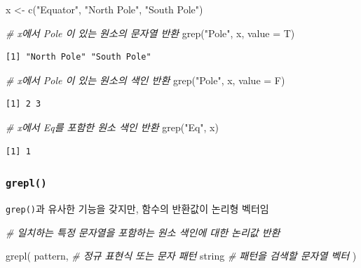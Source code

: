 \documentclass[
  11pt,
]{krantz}
\newenvironment{Shaded}{\begin{snugshade}}{\end{snugshade}}
\newcommand{\AttributeTok}[1]{\textcolor[rgb]{0.61,0.61,0.61}{#1}}
\newcommand{\CommentTok}[1]{\textcolor[rgb]{0.37,0.37,0.37}{\textit{#1}}}
\newcommand{\FunctionTok}[1]{\textcolor[rgb]{0,0,0}{#1}}
\newcommand{\NormalTok}[1]{#1}
\newcommand{\OtherTok}[1]{\textcolor[rgb]{0.37,0.37,0.37}{#1}}
\newcommand{\StringTok}[1]{\textcolor[rgb]{0.5,0.5,0.5}{#1}}
\begin{document}
\normalsize

\footnotesize

\begin{Shaded}
\begin{Highlighting}[]
\NormalTok{x }\OtherTok{\textless{}{-}} \FunctionTok{c}\NormalTok{(}\StringTok{"Equator"}\NormalTok{, }\StringTok{"North Pole"}\NormalTok{, }\StringTok{"South Pole"}\NormalTok{)}

\CommentTok{\# x에서 Pole 이 있는 원소의 문자열 반환}
\FunctionTok{grep}\NormalTok{(}\StringTok{"Pole"}\NormalTok{, x, }\AttributeTok{value =}\NormalTok{ T)}
\end{Highlighting}
\end{Shaded}

\begin{verbatim}
[1] "North Pole" "South Pole"
\end{verbatim}

\begin{Shaded}
\begin{Highlighting}[]
\CommentTok{\# x에서 Pole 이 있는 원소의 색인 반환}
\FunctionTok{grep}\NormalTok{(}\StringTok{"Pole"}\NormalTok{, x, }\AttributeTok{value =}\NormalTok{ F)}
\end{Highlighting}
\end{Shaded}

\begin{verbatim}
[1] 2 3
\end{verbatim}

\begin{Shaded}
\begin{Highlighting}[]
\CommentTok{\# x에서 Eq를 포함한 원소 색인 반환}
\FunctionTok{grep}\NormalTok{(}\StringTok{"Eq"}\NormalTok{, x)}
\end{Highlighting}
\end{Shaded}

\begin{verbatim}
[1] 1
\end{verbatim}

\normalsize

\hypertarget{grepl}{%
\subsubsection*{\texorpdfstring{\textbf{\texttt{grepl()}}}{grepl()}}\label{grepl}}


\texttt{grep()}과 유사한 기능을 갖지만, 함수의 반환값이 논리형 벡터임

\footnotesize

\begin{Shaded}
\begin{Highlighting}[]
\CommentTok{\# 일치하는 특정 문자열을 포함하는 원소 색인에 대한 논리값 반환}

\FunctionTok{grepl}\NormalTok{(}
\NormalTok{  pattern, }\CommentTok{\# 정규 표현식 또는 문자 패턴}
\NormalTok{  string  }\CommentTok{\# 패턴을 검색할 문자열 벡터}
\NormalTok{)}
\end{Highlighting}
\end{Shaded}
\end{document}
